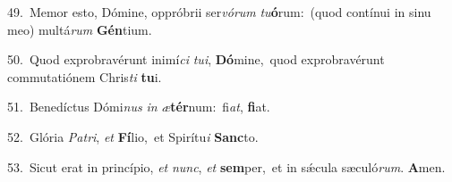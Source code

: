 {\numbfont\textcolor{\numbcolor}{49.}}~Memor esto, Dómine, oppróbrii ser\-\textit{vó}\-\textit{rum} \textit{tu}\-\textbf{ó}rum:~\star (quod contínui in sinu meo) multá\textit{rum} \textbf{Gén}\-tium.\par
{\numbfont\textcolor{\numbcolor}{50.}}~Quod exprobravérunt inimí\textit{ci} \textit{tu}\-\textit{i}, \textbf{Dó}\-mine,~\star quod exprobravérunt commutatiónem Chris\textit{ti} \textbf{tu}\-i.\par
{\numbfont\textcolor{\numbcolor}{51.}}~Benedíctus Dómi\textit{nus} \textit{in} \textit{æ}\-\textbf{tér}num:~\star fi\-\textit{at}\-, \textbf{fi}\-at.\par
{\numbfont\textcolor{\numbcolor}{52.}}~Glória \textit{Pa}\-\textit{tri}, \textit{et} \textbf{Fí}\-lio,~\star et Spirítu\textit{i} \textbf{Sanc}\-to.\par
{\numbfont\textcolor{\numbcolor}{53.}}~Sicut erat in princípio, \textit{et} \textit{nunc}\-, \textit{et} \textbf{sem}\-per,~\star et in sǽcula sæculó\-\textit{rum}\-. \textbf{A}\-men.\par
